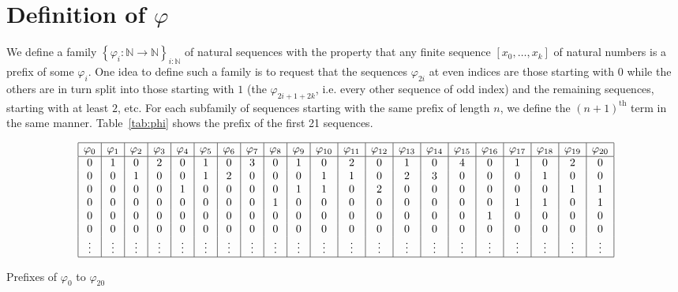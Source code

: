 \documentclass[envcountsame]{llncs}
\newcommand{\N}{\mathbb{N}}
\providecommand{\set}  [1]{\left\{#1\right\}}
\begin{document}



\appendix
\section{Definition of $\varphi$}
We define a family $\set{\varphi_i:\N\to\N}_{i:\N}$ of natural sequences with the property that any finite sequence $[x_0,\dots,x_k]$ of natural numbers is a prefix of some $\varphi_i$. One idea to define such a family is to request that the sequences $\varphi_{2i}$ at even indices are those starting with $0$ while the others are in turn split into  those starting with $1$ (the $\varphi_{2i+1+2k}$, i.e. every other sequence of odd index) and the remaining sequences, starting with at least $2$, etc. For each subfamily of sequences starting with the same prefix of length $n$, we define the $(n+1)^{\text{th}}$ term in the same manner.
Table~\ref{tab:phi} shows the prefix of the first 21 sequences.

\noindent
\begin{table}\label{tab:phi}
\[\begin{array}{|c|c|c|c|c|c|c|c|c|c|c|c|c|c|c|c|c|c|c|c|c|}
\hline
\varphi_{0} & \varphi_{1} & \varphi_{2} & \varphi_{3} & \varphi_{4} & \varphi_{5} & \varphi_{6} & \varphi_{7} & \varphi_{8} & \varphi_{9} & \varphi_{10} & \varphi_{11} & \varphi_{12} & \varphi_{13} & \varphi_{14} & \varphi_{15} & \varphi_{16} & \varphi_{17} & \varphi_{18} & \varphi_{19} & \varphi_{20}\\
\hline
0 & 1 & 0 & 2 & 0 & 1 & 0 & 3 & 0 & 1 & 0 & 2 & 0 & 1 & 0 & 4 & 0 & 1 & 0 & 2 & 0\\
0 & 0 & 1 & 0 & 0 & 1 & 2 & 0 & 0 & 0 & 1 & 1 & 0 & 2 & 3 & 0 & 0 & 0 & 1 & 0 & 0\\
0 & 0 & 0 & 0 & 1 & 0 & 0 & 0 & 0 & 1 & 1 & 0 & 2 & 0 & 0 & 0 & 0 & 0 & 0 & 1 & 1\\
0 & 0 & 0 & 0 & 0 & 0 & 0 & 0 & 1 & 0 & 0 & 0 & 0 & 0 & 0 & 0 & 0 & 1 & 1 & 0 & 1\\
0 & 0 & 0 & 0 & 0 & 0 & 0 & 0 & 0 & 0 & 0 & 0 & 0 & 0 & 0 & 0 & 1 & 0 & 0 & 0 & 0\\
0 & 0 & 0 & 0 & 0 & 0 & 0 & 0 & 0 & 0 & 0 & 0 & 0 & 0 & 0 & 0 & 0 & 0 & 0 & 0 & 0\\
\vdots & \vdots & \vdots & \vdots & \vdots & \vdots & \vdots & \vdots & \vdots & \vdots & \vdots & \vdots & \vdots & \vdots & \vdots & \vdots & \vdots & \vdots & \vdots & \vdots & \vdots\\
\hline
\end{array}\]
\caption{Prefixes of $\varphi_0$ to $\varphi_{20}$}
\end{table}
\end{document}
